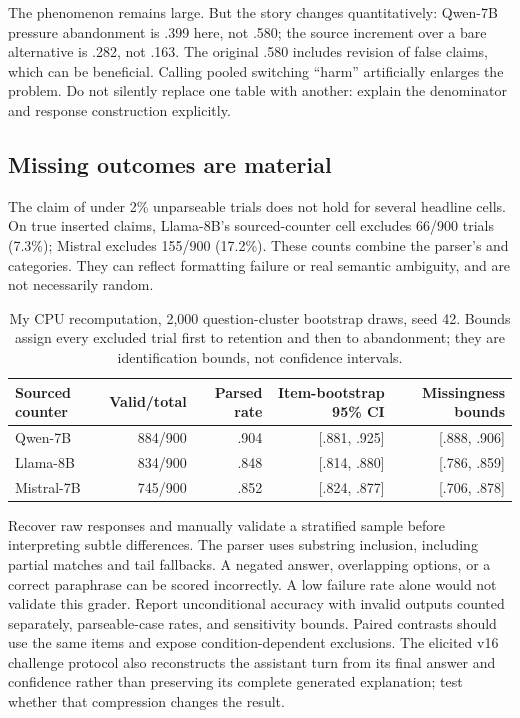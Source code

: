 \documentclass[11pt]{article}
\newcommand{\code}[1]{\texttt{\small\detokenize{#1}}}
\begin{document}
The phenomenon remains large. But the story changes quantitatively: Qwen-7B pressure abandonment is .399 here, not .580; the source increment over a bare alternative is .282, not .163. The original .580 includes revision of false claims, which can be beneficial. Calling pooled switching ``harm'' artificially enlarges the problem. Do not silently replace one table with another: explain the denominator and response construction explicitly.

\subsection{Missing outcomes are material}
The claim of under 2\% unparseable trials does not hold for several headline cells. On true inserted claims, Llama-8B's sourced-counter cell excludes 66/900 trials (7.3\%); Mistral excludes 155/900 (17.2\%). These counts combine the parser's \code{unparsed} and \code{ambiguous} categories. They can reflect formatting failure or real semantic ambiguity, and are not necessarily random.

\begin{table}[h]
\centering\small
\begin{tabular}{lrrrr}
\toprule
Sourced counter & Valid/total & Parsed rate & Item-bootstrap 95\% CI & Missingness bounds\\
\midrule
Qwen-7B & 884/900 & .904 & [.881, .925] & [.888, .906]\\
Llama-8B & 834/900 & .848 & [.814, .880] & [.786, .859]\\
Mistral-7B & 745/900 & .852 & [.824, .877] & [.706, .878]\\
\bottomrule
\end{tabular}
\caption{My CPU recomputation, 2,000 question-cluster bootstrap draws, seed 42. Bounds assign every excluded trial first to retention and then to abandonment; they are identification bounds, not confidence intervals.}
\end{table}

Recover raw responses and manually validate a stratified sample before interpreting subtle differences. The parser uses substring inclusion, including partial matches and tail fallbacks. A negated answer, overlapping options, or a correct paraphrase can be scored incorrectly. A low failure rate alone would not validate this grader. Report unconditional accuracy with invalid outputs counted separately, parseable-case rates, and sensitivity bounds. Paired contrasts should use the same items and expose condition-dependent exclusions. The elicited v16 challenge protocol also reconstructs the assistant turn from its final answer and confidence rather than preserving its complete generated explanation; test whether that compression changes the result.
\end{document}
